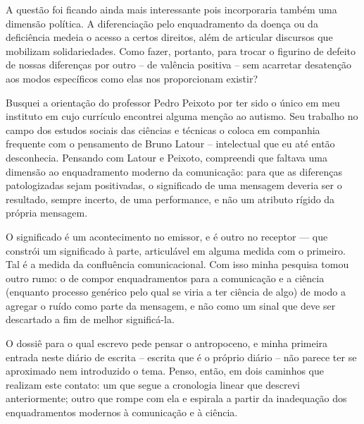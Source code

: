 A questão foi ficando ainda mais interessante pois incorporaria também uma dimensão política. A diferenciação pelo enquadramento da doença ou da deficiência medeia o acesso a certos direitos, além de articular discursos que mobilizam solidariedades. Como fazer, portanto, para trocar o figurino de defeito de nossas diferenças por outro -- de valência positiva -- sem acarretar desatenção aos modos específicos como elas nos proporcionam existir?

Busquei a orientação do professor Pedro Peixoto por ter sido o único em meu instituto em cujo currículo encontrei alguma menção ao autismo. Seu trabalho no campo dos estudos sociais das ciências e técnicas o coloca em companhia frequente com o pensamento de Bruno Latour -- intelectual que eu até então desconhecia. Pensando com Latour e Peixoto, compreendi que faltava uma dimensão ao enquadramento moderno da comunicação: para que as diferenças patologizadas sejam positivadas, o significado de uma mensagem deveria ser o resultado, sempre incerto, de uma performance, e não um atributo rígido da própria mensagem.

O significado é um acontecimento no emissor, e é outro no receptor --- que constrói um significado à parte, articulável em alguma medida com o primeiro. Tal é a medida da confluência comunicacional. Com isso minha pesquisa tomou outro rumo: o de compor enquadramentos para a comunicação e a ciência (enquanto processo genérico pelo qual se viria a ter ciência de algo) de modo a agregar o ruído como parte da mensagem, e não como um sinal que deve ser descartado a fim de melhor significá-la.


O dossiê para o qual escrevo pede pensar o antropoceno, e minha primeira entrada neste diário de escrita -- escrita que é o próprio diário -- não parece ter se aproximado nem introduzido o tema. Penso, então, em dois caminhos que realizam este contato: um que  segue a cronologia linear que descrevi anteriormente; outro que rompe com ela e espirala a partir da inadequação dos enquadramentos modernos à comunicação e à ciência.

